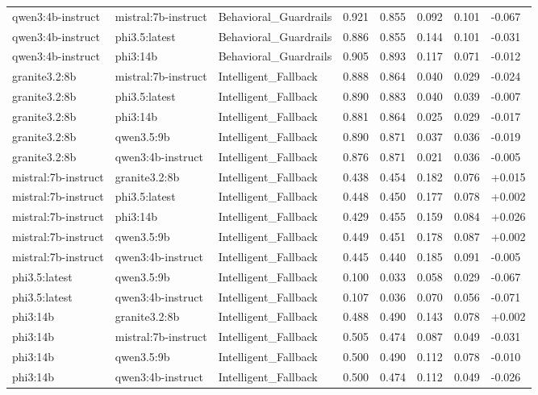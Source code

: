 \begin{table}
\begin{tabular}{llllllll}
qwen3:4b-instruct & mistral:7b-instruct & Behavioral_Guardrails & 0.921 & 0.855 & 0.092 & 0.101 & -0.067 \\
qwen3:4b-instruct & phi3.5:latest & Behavioral_Guardrails & 0.886 & 0.855 & 0.144 & 0.101 & -0.031 \\
qwen3:4b-instruct & phi3:14b & Behavioral_Guardrails & 0.905 & 0.893 & 0.117 & 0.071 & -0.012 \\
granite3.2:8b & mistral:7b-instruct & Intelligent_Fallback & 0.888 & 0.864 & 0.040 & 0.029 & -0.024 \\
granite3.2:8b & phi3.5:latest & Intelligent_Fallback & 0.890 & 0.883 & 0.040 & 0.039 & -0.007 \\
granite3.2:8b & phi3:14b & Intelligent_Fallback & 0.881 & 0.864 & 0.025 & 0.029 & -0.017 \\
granite3.2:8b & qwen3.5:9b & Intelligent_Fallback & 0.890 & 0.871 & 0.037 & 0.036 & -0.019 \\
granite3.2:8b & qwen3:4b-instruct & Intelligent_Fallback & 0.876 & 0.871 & 0.021 & 0.036 & -0.005 \\
mistral:7b-instruct & granite3.2:8b & Intelligent_Fallback & 0.438 & 0.454 & 0.182 & 0.076 & +0.015 \\
mistral:7b-instruct & phi3.5:latest & Intelligent_Fallback & 0.448 & 0.450 & 0.177 & 0.078 & +0.002 \\
mistral:7b-instruct & phi3:14b & Intelligent_Fallback & 0.429 & 0.455 & 0.159 & 0.084 & +0.026 \\
mistral:7b-instruct & qwen3.5:9b & Intelligent_Fallback & 0.449 & 0.451 & 0.178 & 0.087 & +0.002 \\
mistral:7b-instruct & qwen3:4b-instruct & Intelligent_Fallback & 0.445 & 0.440 & 0.185 & 0.091 & -0.005 \\
phi3.5:latest & qwen3.5:9b & Intelligent_Fallback & 0.100 & 0.033 & 0.058 & 0.029 & -0.067 \\
phi3.5:latest & qwen3:4b-instruct & Intelligent_Fallback & 0.107 & 0.036 & 0.070 & 0.056 & -0.071 \\
phi3:14b & granite3.2:8b & Intelligent_Fallback & 0.488 & 0.490 & 0.143 & 0.078 & +0.002 \\
phi3:14b & mistral:7b-instruct & Intelligent_Fallback & 0.505 & 0.474 & 0.087 & 0.049 & -0.031 \\
phi3:14b & qwen3.5:9b & Intelligent_Fallback & 0.500 & 0.490 & 0.112 & 0.078 & -0.010 \\
phi3:14b & qwen3:4b-instruct & Intelligent_Fallback & 0.500 & 0.474 & 0.112 & 0.049 & -0.026 \\

\end{tabular}
\end{table}
